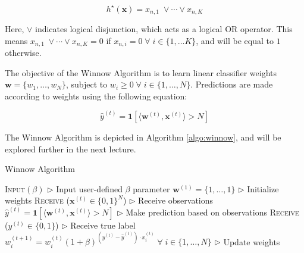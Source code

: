 \documentclass[11pt]{article}
\begin{document}
$$h^\star(\boldsymbol{x})=x_{n,1}\;\vee\cdots\vee x_{n,K}$$

Here, $\vee$ indicates logical disjunction, which acts as a logical OR operator. This means $x_{n,1}\;\vee\cdots\vee x_{n,K} = 0$ if $x_{n,i} = 0\;\forall\;i\in\{1,\dots K\}$, and will be equal to $1$ otherwise.

The objective of the Winnow Algorithm is to learn linear classifier weights $\boldsymbol{w} = \{w_1,\dots,w_N\}$, subject to $w_i\ge 0\;\forall\;i\in\{1,\dots,N\}$. Predictions are made according to weights using the following equation:

$$\hat{y}^{(t)} = \boldsymbol{1}\left[\langle\boldsymbol{w}^{(t)},\boldsymbol{x}^{(t)}\rangle > N\right]$$

The Winnow Algorithm is depicted in Algorithm \ref{algo:winnow}, and will be explored further in the next lecture.

\begin{algorithm}[H]
\caption{Winnow Algorithm}
\label{algo:winnow}
\begin{algorithmic}[1]
\STATE \textsc{Input}$(\beta)$ \hfill $\triangleright$ Input user-defined $\beta$ parameter
\STATE $\boldsymbol{w}^{(1)} = \{1,\dots,1\}$  \hfill $\triangleright$ Initialize weights
\STATE \textsc{Receive} ($\boldsymbol{x}^{(t)}\in\{0,1\}^N$) \hfill $\triangleright$ Receive observations
\STATE $\hat{y}^{(t)} = \boldsymbol{1}\left[\langle\boldsymbol{w}^{(t)},\boldsymbol{x}^{(t)}\rangle > N\right]$ \hfill $\triangleright$ Make prediction based on observations
\STATE \textsc{Receive} ($y^{(t)}\in\{0,1\}$) \hfill $\triangleright$ Receive true label
\STATE $w_i^{(t+1)} = w_i^{(t)}(1+\beta)^{(y^{(t)}-\hat{y}^{(t)})\cdot x_i^{(t)}}\;\forall\; i\in \{1,\dots,N\}$ \hfill $\triangleright$ Update weights
\ENDFOR
\end{algorithmic}
\end{algorithm}


{


}


\end{document}
